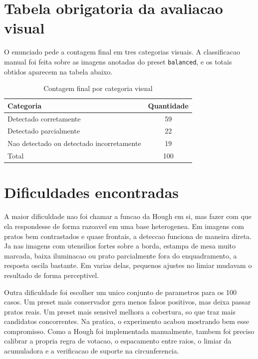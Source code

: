 \documentclass[12pt,a4paper]{article}
\newcommand{\VisualCorrect}{59}
\newcommand{\VisualPartial}{22}
\newcommand{\VisualIncorrect}{19}
\begin{document}
\section{Tabela obrigatoria da avaliacao visual}

O enunciado pede a contagem final em tres categorias visuais. A classificacao manual foi feita sobre as imagens anotadas do preset \texttt{balanced}, e os totais obtidos aparecem na tabela abaixo.

\begin{table}[H]
    \centering
    \caption{Contagem final por categoria visual}
    \begin{tabular}{lc}
        \toprule
        Categoria & Quantidade \\
        \midrule
        Detectado corretamente & \VisualCorrect \\
        Detectado parcialmente & \VisualPartial \\
        Nao detectado ou detectado incorretamente & \VisualIncorrect \\
        \midrule
        Total & 100 \\
        \bottomrule
    \end{tabular}
\end{table}

\section{Dificuldades encontradas}

A maior dificuldade nao foi chamar a funcao da Hough em si, mas fazer com que ela respondesse de forma razoavel em uma base heterogenea. Em imagens com pratos bem contrastados e quase frontais, a deteccao funciona de maneira direta. Ja nas imagens com utensilios fortes sobre a borda, estampa de mesa muito marcada, baixa iluminacao ou prato parcialmente fora do enquadramento, a resposta oscila bastante. Em varias delas, pequenos ajustes no limiar mudavam o resultado de forma perceptivel.

Outra dificuldade foi escolher um unico conjunto de parametros para os 100 casos. Um preset mais conservador gera menos falsos positivos, mas deixa passar pratos reais. Um preset mais sensivel melhora a cobertura, so que traz mais candidatos concorrentes. Na pratica, o experimento acabou mostrando bem esse compromisso. Como a Hough foi implementada manualmente, tambem foi preciso calibrar a propria regra de votacao, o espacamento entre raios, o limiar da acumuladora e a verificacao de suporte na circunferencia.
\end{document}
